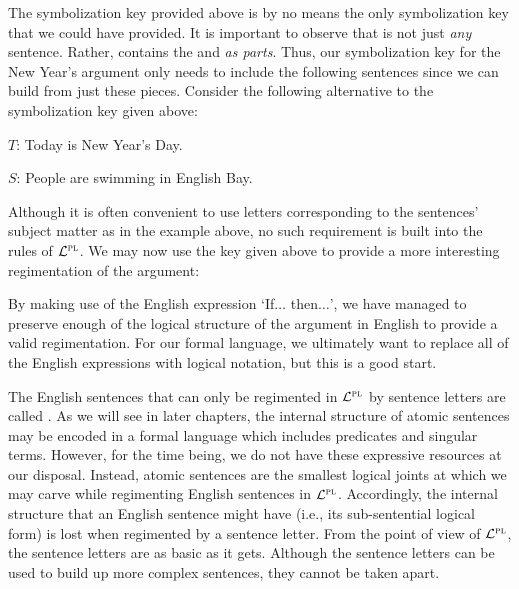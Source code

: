 The symbolization key provided above is by no means the only symbolization key that we could have provided.
It is important to observe that  is not just \emph{any} sentence.
Rather,  contains the  and  \emph{as parts}.
Thus, our symbolization key for the New Year's argument only needs to include the following sentences since we can build  from just these pieces.
Consider the following alternative to the symbolization key given above:

\begin{ekey}
\item[$T$:] Today is New Year's Day.
\item[$S$:] People are swimming in English Bay.
\end{ekey}

Although it is often convenient to use letters corresponding to the sentences' subject matter as in the example above, no such requirement is built into the rules of $\mathcal{L}^{\textsc{pl}}$.
We may now use the key given above to provide a more interesting regimentation of the argument:

\begin{earg}
\end{earg}

By making use of the English expression `If$\ldots$ then$\ldots$', we have managed to preserve enough of the logical structure of the argument in English to provide a valid regimentation.
For our formal language, we ultimately want to replace all of the English expressions with logical notation, but this is a good start.

The English sentences that can only be regimented in $\mathcal{L}^{\textsc{pl}}$ by sentence letters are called .
As we will see in later chapters, the internal structure of atomic sentences may be encoded in a formal language which includes predicates and singular terms.
However, for the time being, we do not have these expressive resources at our disposal.
Instead, atomic sentences are the smallest logical joints at which we may carve while regimenting English sentences in $\mathcal{L}^{\textsc{pl}}$.
Accordingly, the internal structure that an English sentence might have (i.e., its sub-sentential logical form) is lost when regimented by a sentence letter.
From the point of view of $\mathcal{L}^{\textsc{pl}}$, the sentence letters are as basic as it gets.
Although the sentence letters can be used to build up more complex sentences, they cannot be taken apart.

